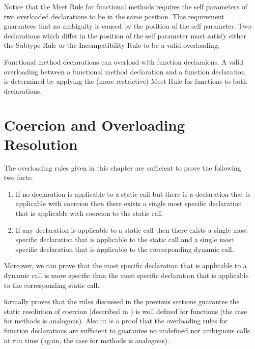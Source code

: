 Notice that the Meet Rule for functional methods requires the self
parameters of two overloaded declarations to be in the same position.
This requirement guarantees that no ambiguity is caused by the
position of the self parameter.  Two declarations which differ in the
position of the self parameter must satisfy either the Subtype Rule or
the Incompatibility Rule to be a valid overloading.

Functional method declarations can overload with function declaraions.
A valid overloading between a functional method declaration and
a function declaration is
determined by applying the (more restrictive) Meet Rule for functions
to both declarations.

\section{Coercion and Overloading Resolution}

The overloading rules given in this chapter are
sufficient to prove the following two facts:
\begin{enumerate}
\item
If no declaration is applicable to a static call but there is a
declaration that is applicable with coercion then there exists a
single most specific declaration that is applicable with coercion to
the static call.
\item
If any declaration is applicable to a static call then there exists a
single most specific declaration that is applicable to the static call
and a single most specific declaration that is applicable to the
corresponding dynamic call.
\end{enumerate}

Moreover, we can prove that the most specific declaration that is
applicable to a dynamic call is more specific than the most specific
declaration that is applicable to the corresponding static call.

 formally proves that
the rules discussed in the previous sections guarantee the static resolution of
coercion (described in ) is well defined
for functions (the case for methods is analogous).  Also in
 is a proof that
the overloading rules for
 function declarations are sufficient to guarantee no
undefined nor ambiguous calls at run time (again,
the case for methods is analogous).
